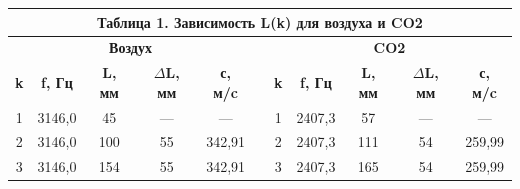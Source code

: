 \documentclass[11pt,a4paper,oneside]{article}
\begin{document}
\begin{enumerate}
\begin{center}
\begin{table}[h!]
\begin{tabular}{ccccccccccc}
\multicolumn{11}{c}{\textbf{Таблица 1. Зависимость L(k) для воздуха и CO2}}                                                                                                                                                                                                                                                                                                                                                    \\ \hline
\multicolumn{5}{|c|}{\textbf{Воздух}}                                                                                                                                                          & \multicolumn{1}{c|}{}          & \multicolumn{5}{c|}{\textbf{CO2}}                                                                                                                                                             \\ \hline
\multicolumn{1}{|c|}{\textbf{k}} & \multicolumn{1}{c|}{\textbf{f, Гц}} & \multicolumn{1}{c|}{\textbf{L, мм}} & \multicolumn{1}{c|}{\textbf{$\Delta$L, мм}}  & \multicolumn{1}{c|}{\textbf{с, м/c}} & \multicolumn{1}{c|}{\textbf{}} & \multicolumn{1}{c|}{\textbf{k}} & \multicolumn{1}{c|}{\textbf{f, Гц}} & \multicolumn{1}{c|}{\textbf{L, мм}} & \multicolumn{1}{c|}{\textbf{$\Delta$L, мм}} & \multicolumn{1}{c|}{\textbf{с, м/c}} \\ \hline
\multicolumn{1}{|c|}{1}          & \multicolumn{1}{c|}{3146,0}         & \multicolumn{1}{c|}{45}             & \multicolumn{1}{c|}{---}                     & \multicolumn{1}{c|}{---}             & \multicolumn{1}{c|}{}          & \multicolumn{1}{c|}{1}          & \multicolumn{1}{c|}{2407,3}         & \multicolumn{1}{c|}{57}             & \multicolumn{1}{c|}{---}                    & \multicolumn{1}{c|}{---}             \\ \hline
\multicolumn{1}{|c|}{2}          & \multicolumn{1}{c|}{3146,0}         & \multicolumn{1}{c|}{100}            & \multicolumn{1}{c|}{55}                      & \multicolumn{1}{c|}{342,91}          & \multicolumn{1}{c|}{}          & \multicolumn{1}{c|}{2}          & \multicolumn{1}{c|}{2407,3}         & \multicolumn{1}{c|}{111}            & \multicolumn{1}{c|}{54}                     & \multicolumn{1}{c|}{259,99}          \\ \hline
\multicolumn{1}{|c|}{3}          & \multicolumn{1}{c|}{3146,0}         & \multicolumn{1}{c|}{154}            & \multicolumn{1}{c|}{55}                      & \multicolumn{1}{c|}{342,91}          & \multicolumn{1}{c|}{}          & \multicolumn{1}{c|}{3}          & \multicolumn{1}{c|}{2407,3}         & \multicolumn{1}{c|}{165}            & \multicolumn{1}{c|}{54}                     & \multicolumn{1}{c|}{259,99}          \\ \hline

\end{tabular}
\end{table}
\end{center}
\end{enumerate}
\end{document}
